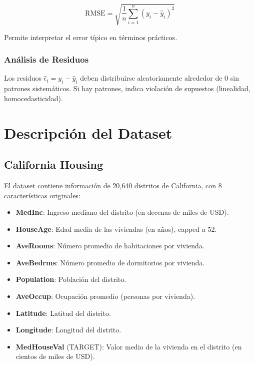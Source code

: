 \documentclass[11pt,a4paper]{article}
\begin{document}
\begin{equation}
\text{RMSE} = \sqrt{\frac{1}{n} \sum_{i=1}^{n} (y_i - \hat{y}_i)^2}
\end{equation}

Permite interpretar el error típico en términos prácticos.

\subsubsection{Análisis de Residuos}

Los residuos $\hat{\epsilon}_i = y_i - \hat{y}_i$ deben distribuirse aleatoriamente alrededor de 0 
sin patrones sistemáticos. Si hay patrones, indica violación de supuestos (linealidad, homocedasticidad).

\newpage

\section{Descripción del Dataset}

\subsection{California Housing}

El dataset contiene información de 20,640 distritos de California, con 8 características originales:

\begin{itemize}
  \item \textbf{MedInc}: Ingreso mediano del distrito (en decenas de miles de USD).
  \item \textbf{HouseAge}: Edad media de las viviendas (en años), capped a 52.
  \item \textbf{AveRooms}: Número promedio de habitaciones por vivienda.
  \item \textbf{AveBedrms}: Número promedio de dormitorios por vivienda.
  \item \textbf{Population}: Población del distrito.
  \item \textbf{AveOccup}: Ocupación promedio (personas por vivienda).
  \item \textbf{Latitude}: Latitud del distrito.
  \item \textbf{Longitude}: Longitud del distrito.
  \item \textbf{MedHouseVal} (TARGET): Valor medio de la vivienda en el distrito (en cientos de miles de USD).
\end{itemize}
\end{document}
